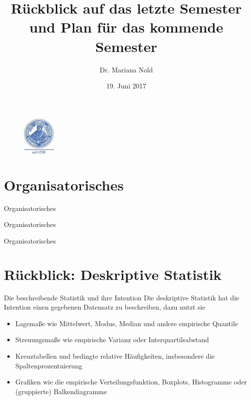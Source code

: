 \documentclass[usenames,dvipsnames,handout]{beamer}
\begin{document}
\author[Dr. Mariana Nold]{Dr. Mariana Nold}
 \date{}
\title [Deskriptive und Induktive Statistik]{Rückblick auf das letzte Semester und Plan für das kommende Semester}
\date{19. Juni 2017}
\begin{frame}
\maketitle

  \begin{figure}[ht]
 	\centering
 	      \includegraphics[width=0.15\textwidth]{index.jpeg}
 	\end{figure}
\end{frame} 
\section{Organisatorisches}
\begin{frame}{Organisatorisches}
\end{frame}

\begin{frame}{Organisatorisches}
\end{frame}

\begin{frame}{Organisatorisches}
\end{frame}

\section{Rückblick: Deskriptive Statistik}
\begin{frame}{Die beschreibende Statistik und ihre Intention}
Die deskriptive Statistik hat die Intention einen gegebenen Datensatz zu beschreiben, dazu nutzt sie
\begin{itemize}
\item{Lagemaße wie Mittelwert, Modus, Median und andere empirische Quantile}
\item{Streuungsmaße wie empirische Varianz oder Interquartilsabstand}
\item{Kreuztabellen und bedingte relative Häufigkeiten, insbesondere die Spaltenprozentuierung}
\item{Grafiken wie die empirische Verteilungsfunktion, Boxplots, Histogramme
oder (gruppierte) Balkendiagramme}
\end{itemize}
\end{frame}
\end{document}
